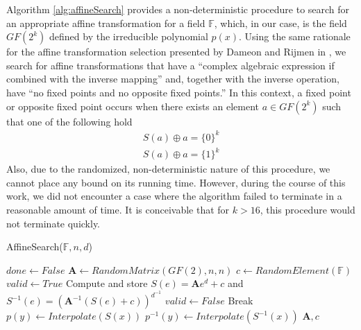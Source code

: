 Algorithm \ref{alg:affineSearch} provides a non-deterministic procedure to search for an appropriate affine transformation for a field $\mathbb{F}$, which, in our case, is the field $GF(2^k)$ defined by the irreducible polynomial $p(x)$. Using the same rationale for the affine transformation selection presented by Dameon and Rijmen in \cite{Daemen02-1}, we search for affine transformations that have a ``complex algebraic expression if combined with the inverse mapping'' and, together with the inverse operation, have ``no fixed points and no opposite fixed points.'' In this context, a fixed point or opposite fixed point occurs when there exists an element $a \in GF(2^k)$ such that one of the following hold
\begin{align*}
S(a) \oplus a = \{0\}^k \\
S(a) \oplus a = \{1\}^k
\end{align*}
Also, due to the randomized, non-deterministic nature of this procedure, we cannot place any bound on its running time. However, during the course of this work, we did not encounter a case where the algorithm failed to terminate in a reasonable amount of time. It is conceivable that for $k > 16$, this procedure would not terminate quickly.
\begin{algorithm}[t] %
\caption{AffineSearch($\mathbb{F}, n, d$)} \label{alg:affineSearch}
\begin{algorithmic}[1]
\State $done \gets False$
\Repeat 
  \State $\mathbf{A} \gets RandomMatrix(GF(2), n, n)$
  \State $c \gets RandomElement(\mathbb{F})$
   
    \State $valid \gets True$
        \State Compute and store $S(e) = \mathbf{A}e^d + c$ and $S^{-1}(e) = (\mathbf{A}^{-1}(S(e) + c))^{d^{-1}}$
      \Else
        \State $valid \gets False$
        \State Break
      \EndIf
    \EndFor
      \State $p(y) \gets Interpolate(S(x))$
      \State $p^{-1}(y) \gets Interpolate(S^{-1}(x))$
        \State \Return $\mathbf{A}, c$
      \EndIf
    \EndIf
  \EndIf
{}
\end{algorithmic}
\end{algorithm}

